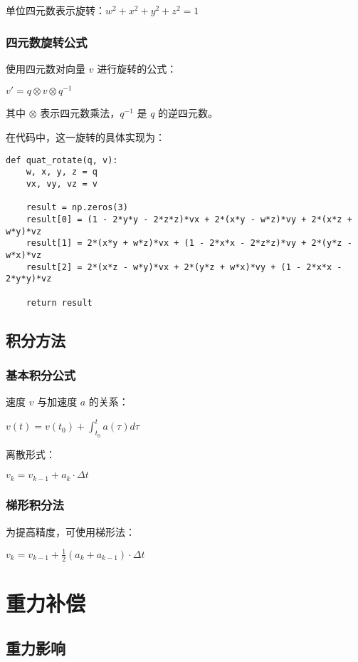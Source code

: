 \documentclass[12pt,a4paper]{article}
\begin{document}
单位四元数表示旋转：$w^2 + x^2 + y^2 + z^2 = 1$

\subsubsection{四元数旋转公式}

使用四元数对向量 $v$ 进行旋转的公式：

$v' = q \otimes v \otimes q^{-1}$

其中 $\otimes$ 表示四元数乘法，$q^{-1}$ 是 $q$ 的逆四元数。

在代码中，这一旋转的具体实现为：

\begin{lstlisting}
def quat_rotate(q, v):
    w, x, y, z = q
    vx, vy, vz = v
    
    result = np.zeros(3)
    result[0] = (1 - 2*y*y - 2*z*z)*vx + 2*(x*y - w*z)*vy + 2*(x*z + w*y)*vz
    result[1] = 2*(x*y + w*z)*vx + (1 - 2*x*x - 2*z*z)*vy + 2*(y*z - w*x)*vz
    result[2] = 2*(x*z - w*y)*vx + 2*(y*z + w*x)*vy + (1 - 2*x*x - 2*y*y)*vz
    
    return result
\end{lstlisting}

\subsection{积分方法}

\subsubsection{基本积分公式}

速度 $v$ 与加速度 $a$ 的关系：

$v(t) = v(t_0) + \int_{t_0}^{t} a(\tau) d\tau$

离散形式：

$v_k = v_{k-1} + a_k \cdot \Delta t$

\subsubsection{梯形积分法}

为提高精度，可使用梯形法：

$v_k = v_{k-1} + \frac{1}{2}(a_k + a_{k-1}) \cdot \Delta t$

\section{重力补偿}

\subsection{重力影响}
\end{document}

